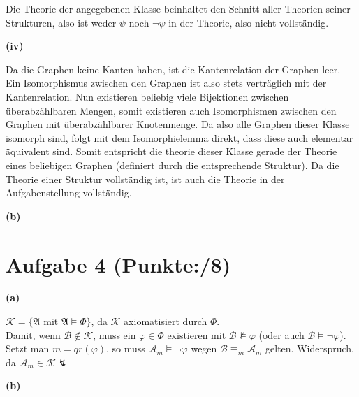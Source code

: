 \documentclass[11pt, a4paper]{article}
\newcommand{\ppp}{8}
\begin{document}
\begin{adjustwidth}{20pt}{20pt}
\begin{adjustwidth}{2em}{0em}
	Die Theorie der angegebenen Klasse beinhaltet den Schnitt aller Theorien seiner Strukturen, also ist weder $\psi$ noch $\neg\psi$ in der Theorie, also nicht vollständig.
\end{adjustwidth}
\textbf{(iv)}
\begin{adjustwidth}{2em}{0em}\vspace{-\baselineskip}
Da die Graphen keine Kanten haben, ist die Kantenrelation der Graphen leer. Ein Isomorphismus zwischen den Graphen ist also stets verträglich mit der Kantenrelation. Nun existieren beliebig viele
Bijektionen zwischen überabzählbaren Mengen, somit existieren auch Isomorphismen zwischen den Graphen mit überabzählbarer Knotenmenge. Da also alle Graphen dieser Klasse isomorph sind, folgt
mit dem Isomorphielemma direkt, dass diese auch elementar äquivalent sind. Somit entspricht die theorie dieser Klasse gerade der Theorie eines beliebigen Graphen (definiert durch die
entsprechende Struktur). Da die Theorie einer Struktur vollständig ist, ist auch die Theorie in der Aufgabenstellung vollständig. 
\end{adjustwidth}
\end{adjustwidth}
\textbf{(b)}
\begin{adjustwidth}{20pt}{20pt}
	
\end{adjustwidth}

\section*{Aufgabe 4 (Punkte:\qquad/\ppp)}
\textbf{(a)}
\begin{adjustwidth}{20pt}{20pt}
$\mathcal{K}=\{ \mathfrak{A} \text{ mit } \mathfrak{A} \models \Phi \}$, da $\mathcal{K}$ axiomatisiert durch $\Phi$.\\
 Damit, wenn $\mathcal{B} \notin \mathcal{K}$, muss ein $\varphi \in \Phi$ existieren mit $\mathcal{B} \not \models \varphi$ (oder auch $\mathcal{B} \models \neg \varphi$). Setzt man $m=qr(\varphi)$, so muss $\mathcal{A}_m \models \neg \varphi$ wegen $\mathcal{B} \equiv_m \mathcal{A}_m$  gelten. Widerspruch, da $\mathcal{A}_m \in \mathcal{K} \lightning$ 
\end{adjustwidth}
\textbf{(b)}
\begin{adjustwidth}{20pt}{20pt}
	
\end{adjustwidth}
\end{document}
